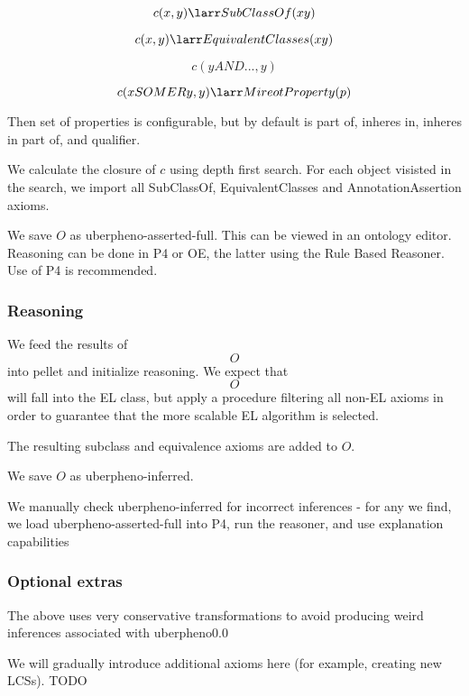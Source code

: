 $$
c(x,y) \larr SubClassOf(x y)
$$

$$
c(x,y) \larr EquivalentClasses(x y)
$$

$$
c(y AND ...,y)
$$

$$
c(x SOME R y,y) \larr MireotProperty(p)
$$

Then set of properties is configurable, but by default is part of, inheres in, inheres in part of, and qualifier.

We calculate the closure of $c$ using depth first search. For each
object visisted in the search, we import all SubClassOf,
EquivalentClasses and AnnotationAssertion axioms.

We save $O$ as uberpheno-asserted-full. This can be viewed in an
ontology editor. Reasoning can be done in P4 or OE, the latter using
the Rule Based Reasoner. Use of P4 is recommended.

\subsubsection{Reasoning}

We feed the results of $$O$$ into pellet and initialize reasoning. We
expect that $$O$$ will fall into the EL class, but apply a procedure
filtering all non-EL axioms in order to guarantee that the more
scalable EL algorithm is selected.

The resulting subclass and equivalence axioms are added to $O$.

We save $O$ as uberpheno-inferred.

We manually check uberpheno-inferred for incorrect inferences - for
any we find, we load uberpheno-asserted-full into P4, run the
reasoner, and use explanation capabilities

\subsubsection{Optional extras}

The above uses very conservative transformations to avoid producing
weird inferences associated with uberpheno0.0

We will gradually introduce additional axioms here (for example,
creating new LCSs). TODO







